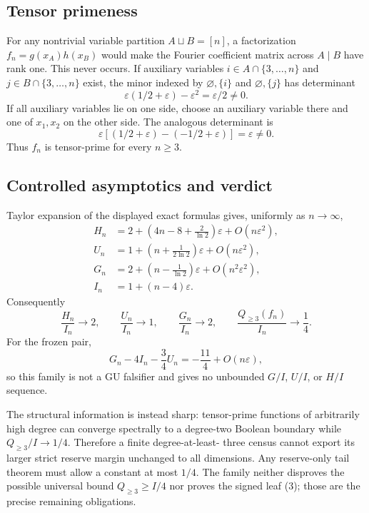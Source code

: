 \subsection*{Tensor primeness}

For any nontrivial variable partition \(A\sqcup B=[n]\), a factorization
\(f_n=g(x_A)h(x_B)\) would make the Fourier coefficient matrix across
\(A\mid B\) have rank one.  This never occurs.  If auxiliary variables
\(i\in A\cap\{3,\ldots,n\}\) and
\(j\in B\cap\{3,\ldots,n\}\) exist, the minor indexed by
\(\varnothing,\{i\}\) and \(\varnothing,\{j\}\) has determinant
\[
 \varepsilon(1/2+\varepsilon)-\varepsilon^2
 =\varepsilon/2\ne0.
\]
If all auxiliary variables lie on one side, choose an auxiliary variable
there and one of \(x_1,x_2\) on the other side.  The analogous determinant
is
\[
 \varepsilon[(1/2+\varepsilon)-(-1/2+\varepsilon)]
 =\varepsilon\ne0.
\]
Thus \(f_n\) is tensor-prime for every \(n\ge3\).

\subsection*{Controlled asymptotics and verdict}

Taylor expansion of the displayed exact formulas gives, uniformly as
\(n\to\infty\),
\[
 \begin{aligned}
 H_n&=2+\left(4n-8+\frac2{\ln2}\right)\varepsilon
          +O(n\varepsilon^2),\\
 U_n&=1+\left(n+\frac1{2\ln2}\right)\varepsilon
          +O(n\varepsilon^2),\\
 G_n&=2+\left(n-\frac1{\ln2}\right)\varepsilon
          +O(n^2\varepsilon^2),\\
 I_n&=1+(n-4)\varepsilon.
 \end{aligned}                                           \tag{11}
\]
Consequently
\[
 \frac{H_n}{I_n}\to2,\qquad
 \frac{U_n}{I_n}\to1,\qquad
 \frac{G_n}{I_n}\to2,\qquad
 \frac{Q_{\ge3}(f_n)}{I_n}\to\frac14.                  \tag{12}
\]
For the frozen pair,
\[
 G_n-4I_n-\frac34U_n
 =-\frac{11}{4}+O(n\varepsilon),                         \tag{13}
\]
so this family is not a GU falsifier and gives no unbounded
\(G/I\), \(U/I\), or \(H/I\) sequence.

The structural information is instead sharp: tensor-prime functions of
arbitrarily high degree can converge spectrally to a degree-two Boolean
boundary while \(Q_{\ge3}/I\to1/4\).  Therefore a finite degree-at-least-
three census cannot export its larger strict reserve margin unchanged to
all dimensions.  Any reserve-only tail theorem must allow a constant at
most \(1/4\).  The family neither disproves the possible universal bound
\(Q_{\ge3}\ge I/4\) nor proves the signed leaf (3); those are the precise
remaining obligations.
